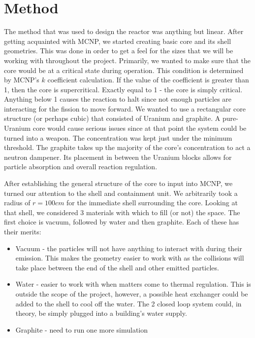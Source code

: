 \section*{Method}
The method that was used to design the reactor was anything but linear. After getting acquainted with MCNP, we started creating basic core and its shell geometries. This was done in order to get a feel for the sizes that we will be working with throughout the project. Primarily, we wanted to make sure that the core would be at a critical state during operation. This condition is determined by MCNP's $k$ coefficient calculation. If the value of the coefficient is greater than 1, then the core is supercritical. Exactly equal to 1 - the core is simply critical. Anything below 1 causes the reaction to halt since not enough particles are interacting for the fission to move forward. We wanted to use a rectangular core structure (or perhaps cubic) that consisted of Uranium and graphite. A pure-Uranium core would cause serious issues since at that point the system could be turned into a weapon. The concentration was kept just under the minimum threshold. The graphite takes up the majority of the core's concentration to act a neutron dampener. Its placement in between the Uranium blocks allows for particle absorption and overall reaction regulation.

After establishing the general structure of the core to input into MCNP, we turned our attention to the shell and containment unit. We arbitrarily took a radius of $r=100cm$ for the immediate shell surrounding the core. Looking at that shell, we considered 3 materials with which to fill (or not) the space. The first choice is vacuum, followed by water and then graphite. Each of these has their merits:
\begin{itemize}
\item Vacuum - the particles will not have anything to interact with during their emission. This makes the geometry easier to work with as the collisions will take place between the end of the shell and other emitted particles.
\item Water - easier to work with when matters come to thermal regulation. This is outside the scope of the project, however, a possible heat exchanger could be added to the shell to cool off the water. The 2 closed loop system could, in theory, be simply plugged into a building's water supply.
\item Graphite - need to run one more simulation
\end{itemize}
